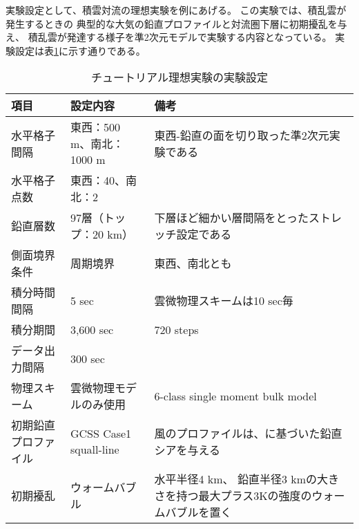 実験設定として、積雲対流の理想実験を例にあげる。
この実験では、積乱雲が発生するときの
典型的な大気の鉛直プロファイルと対流圏下層に初期擾乱を与え、
積乱雲が発達する様子を準2次元モデルで実験する内容となっている。
実験設定は表\ref{tab:setting_ideal}に示す通りである。

\begin{table}[htb]
\begin{center}
\caption{チュートリアル理想実験の実験設定}
\begin{tabularx}{150mm}{|l|X|X|} \hline
 \rowcolor[gray]{0.9} 項目 & 設定内容 & 備考 \\ \hline
 水平格子間隔 & 東西：500 m、南北：1000 m & 東西-鉛直の面を切り取った準2次元実験である \\ \hline
 水平格子点数 & 東西：40、南北：2\footnotemark &  \\ \hline
 鉛直層数     & 97層（トップ：20 km）& 下層ほど細かい層間隔をとったストレッチ設定である \\ \hline
 側面境界条件 & 周期境界 & 東西、南北とも \\ \hline
 積分時間間隔 & 5 sec      & 雲微物理スキームは10 sec毎 \\ \hline
 積分期間     & 3,600 sec  & 720 steps \\ \hline
 データ出力間隔 & 300 sec  &  \\ \hline
 物理スキーム & 雲微物理モデルのみ使用 &
 6-class single moment bulk model \citep{tomita_2008} \\ \hline
 初期鉛直プロファイル & GCSS Case1 squall-line \citep{Redelsperger2000}&
 風のプロファイルは、\citet{Ooyama_2001}に基づいた鉛直シアを与える \\ \hline
 初期擾乱 & ウォームバブル & 水平半径4 km、
 鉛直半径3 kmの大きさを持つ最大プラス3Kの強度のウォームバブルを置く\\ \hline
\end{tabularx}
\label{tab:setting_ideal}
\end{center}
\end{table}



